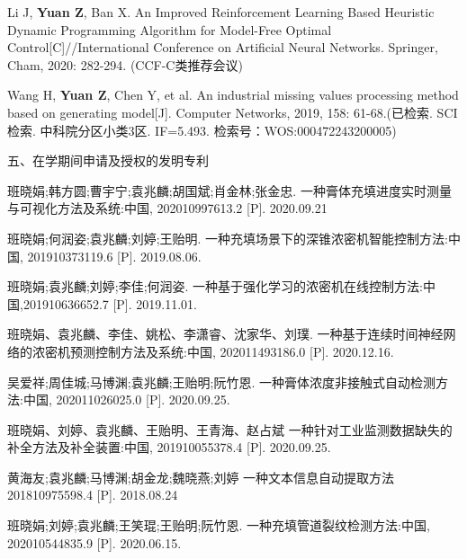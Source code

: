 \begin{enumerate}[label={[\arabic*]}]
\item Li J, \textbf{Yuan Z}, Ban X. An Improved Reinforcement Learning Based Heuristic Dynamic Programming Algorithm for Model-Free Optimal Control[C]//International Conference on Artificial Neural Networks. Springer, Cham, 2020: 282-294. (CCF-C类推荐会议) 
\item Wang H, \textbf{Yuan Z}, Chen Y, et al. An industrial missing values processing method based on generating model[J]. Computer Networks, 2019, 158: 61-68.(已检索. SCI检索. 中科院分区小类3区. IF=5.493. 检索号：WOS:000472243200005)
\end{enumerate}
\par
\noindent 五、在学期间申请及授权的发明专利 \par

\begin{enumerate}[label={[\arabic*]}]  %
\item 班晓娟;韩方圆;曹宇宁;袁兆麟;胡国斌;肖金林;张金忠. 一种膏体充填进度实时测量与可视化方法及系统:中国, 202010997613.2 [P]. 2020.09.21 
 \item 班晓娟;何润姿;袁兆麟;刘婷;王贻明. 一种充填场景下的深锥浓密机智能控制方法:中国, 201910373119.6 [P]. 2019.08.06. 
 \item 班晓娟;袁兆麟;刘婷;李佳;何润姿. 一种基于强化学习的浓密机在线控制方法:中国,201910636652.7 [P]. 2019.11.01. 
 \item 班晓娟、袁兆麟、李佳、姚松、李潇睿、沈家华、刘璞. 一种基于连续时间神经网络的浓密机预测控制方法及系统:中国, 202011493186.0 [P]. 2020.12.16. 
\item 吴爱祥;周佳城;马博渊;袁兆麟;王贻明;阮竹恩. 一种膏体浓度非接触式自动检测方法:中国, 202011026025.0 [P]. 2020.09.25. 
\item 班晓娟、刘婷、袁兆麟、王贻明、王青海、赵占斌 一种针对工业监测数据缺失的补全方法及补全装置:中国, 201910055378.4 [P]. 2020.09.25. 
\item 黄海友;袁兆麟;马博渊;胡金龙;魏晓燕;刘婷 一种文本信息自动提取方法201810975598.4 [P]. 2018.08.24 
 \item 班晓娟;刘婷;袁兆麟;王笑琨;王贻明;阮竹恩. 一种充填管道裂纹检测方法:中国, 202010544835.9 [P]. 2020.06.15.
\end{enumerate}

